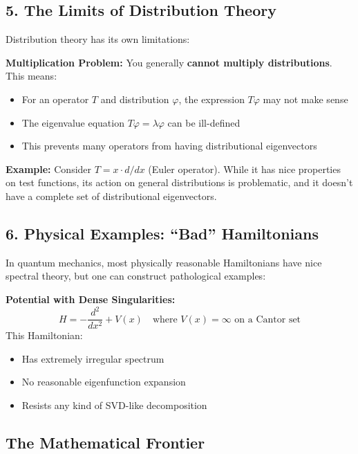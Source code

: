 \documentclass[aps,prl,reprint]{revtex4-2}
\begin{document}
\subsection*{5. The Limits of Distribution Theory}

Distribution theory has its own limitations:

\textbf{Multiplication Problem:} You generally \textbf{cannot multiply
distributions}. This means:

\begin{itemize}
\item For an operator $T$ and distribution $\varphi$, the expression $%
T\varphi$ may not make sense

\item The eigenvalue equation $T\varphi = \lambda\varphi$ can be ill-defined

\item This prevents many operators from having distributional eigenvectors
\end{itemize}

\textbf{Example:} Consider $T = x\cdot d/dx$ (Euler operator). While it has
nice properties on test functions, its action on general distributions is
problematic, and it doesn't have a complete set of distributional
eigenvectors.

\subsection*{6. Physical Examples: ``Bad'' Hamiltonians}

In quantum mechanics, most physically reasonable Hamiltonians have nice
spectral theory, but one can construct pathological examples:

\textbf{Potential with Dense Singularities:} 
\begin{equation*}
H = -\frac{d^2}{dx^2} + V(x) \quad \text{where } V(x) = \infty \text{ on a
Cantor set} 
\end{equation*}
This Hamiltonian:

\begin{itemize}
\item Has extremely irregular spectrum

\item No reasonable eigenfunction expansion

\item Resists any kind of SVD-like decomposition
\end{itemize}

\subsection*{The Mathematical Frontier}
\end{document}
